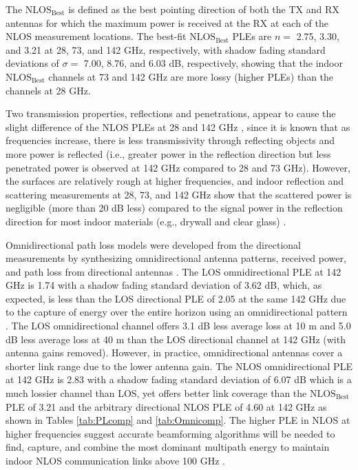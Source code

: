 \documentclass[conference]{IEEEtran}
\begin{document}
The $\text{NLOS}_{\text{Best}}$ is defined as the best pointing direction of both the TX and RX antennas for which the maximum power is received at the RX at each of the NLOS measurement locations. The best-fit $\text{NLOS}_{\text{Best}}$ PLEs are $n=$ 2.75, 3.30, and 3.21 at 28, 73, and 142 GHz, respectively, with shadow fading standard deviations of $\sigma=$ 7.00, 8.76, and 6.03 dB, respectively, showing that the indoor $\text{NLOS}_{\text{Best}}$ channels at 73 and 142 GHz are more lossy (higher PLEs) than the channels at 28 GHz. 

Two transmission properties, reflections and penetrations, appear to cause the slight difference of the NLOS PLEs at 28 and 142 GHz \cite{rappaport19access,xing19GC}, since it is known that as frequencies increase, there is less transmissivity through reflecting objects and more power is reflected (i.e., greater power in the reflection direction but less penetrated power is observed at 142 GHz compared to 28 and 73 GHz)\cite{xing19GC,ju19icc}. However, the surfaces are relatively rough at higher frequencies, and indoor reflection and scattering measurements at 28, 73, and 142 GHz show that the scattered power is negligible (more than 20 dB less) compared to the signal power in the reflection direction for most indoor materials (e.g., drywall and clear glass) \cite{xing19GC,ju19icc}.

Omnidirectional path loss models were developed from the directional measurements by synthesizing omnidirectional antenna patterns, received power, and path loss from directional antennas \cite{sun2015synthesizing,rappaport2015wideband}. The LOS omnidirectional PLE at 142 GHz is 1.74 with a shadow fading standard deviation of 3.62 dB, which, as expected, is less than the LOS directional PLE of 2.05 at the same 142 GHz due to the capture of energy over the entire horizon using an omnidirectional pattern \cite{sun2015synthesizing,rappaport2015wideband}. The LOS omnidirectional channel offers 3.1 dB less average loss at 10 m and 5.0 dB less average loss at 40 m than the LOS directional channel at 142 GHz (with antenna gains removed). However, in practice, omnidirectional antennas cover a shorter link range due to the lower antenna gain. The NLOS omnidirectional PLE at 142 GHz is 2.83 with a shadow fading standard deviation of 6.07 dB which is a much lossier channel than LOS, yet offers better link coverage than the $\text{NLOS}_{\text{Best}}$ PLE of 3.21 and the arbitrary directional NLOS PLE of 4.60 at 142 GHz as shown in Tables \ref{tab:PLcomp} and \ref{tab:Omnicomp}. The higher PLE in NLOS at higher frequencies suggest accurate beamforming algorithms will be needed to find, capture, and combine the most dominant multipath energy to maintain indoor NLOS communication links above 100 GHz \cite{rappaport19access,Sun14a,Sun14b}.
\end{document}
